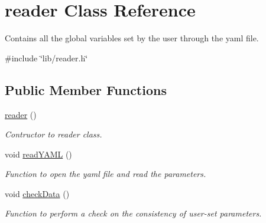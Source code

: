 \hypertarget{classreader}{}\section{reader Class Reference}
\label{classreader}


Contains all the global variables set by the user through the yaml file.  




{\ttfamily \#include \char`\"{}lib/reader.\+h\char`\"{}}

\subsection*{Public Member Functions}
\begin{DoxyCompactItemize}
\item 
\hyperlink{classreader_a9db97d91bc2ad6757407526993ec0ecf}{reader} ()
\begin{DoxyCompactList}\small\item\em Contructor to reader class. \end{DoxyCompactList}\item 
void \hyperlink{classreader_a6564273d216f42c3fd41062a13d046e2}{read\+Y\+A\+ML} ()
\begin{DoxyCompactList}\small\item\em Function to open the yaml file and read the parameters. \end{DoxyCompactList}\item 
void \hyperlink{classreader_ad43f1ae8ffd2c8d33bcf0aa8025b569a}{check\+Data} ()
\begin{DoxyCompactList}\small\item\em Function to perform a check on the consistency of user-\/set parameters. \end{DoxyCompactList}\end{DoxyCompactItemize}

